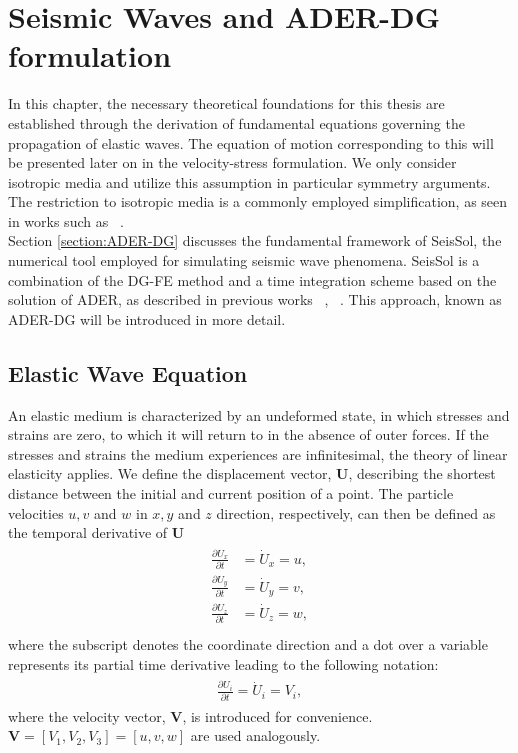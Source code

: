 
\chapter{Seismic Waves and ADER-DG formulation}\label{chapter:seismicwaves}
In this chapter, the necessary theoretical foundations for this thesis are established through the derivation of fundamental equations governing the propagation of elastic waves.
The equation of motion corresponding to this will be presented later on in the velocity-stress formulation.
We only consider isotropic media and utilize this assumption in particular symmetry arguments. The restriction to isotropic media is a commonly employed simplification, as seen in works such as ~\parencite{dumbser1}. \\

Section \ref{section:ADER-DG} discusses the fundamental framework of SeisSol, the numerical tool employed for simulating seismic wave phenomena. SeisSol is a combination
of the \ac{DG-FE} method and a time integration scheme based on the solution of \ac{ADER}, as described in previous works ~\parencite{dumbser1}, ~\parencite{seissol}. This approach, known as 
\ac{ADER}-\ac{DG} will be introduced in more detail.

\section{Elastic Wave Equation}\label{section:elasticwaveequation}
An elastic medium is characterized by an undeformed state, in which stresses and strains are zero, to which it will return to in the absence
of outer forces. If the stresses and strains the medium experiences are infinitesimal, the theory of linear elasticity applies. We define
the displacement vector, $\mathbf{U}$, describing the shortest distance between the initial and current position of a point. The particle
velocities $u,v$ and $w$ in $x, y$ and $z$ direction, respectively, can then be defined as the temporal derivative of $\mathbf{U}$
\begin{align}
    \begin{split}
    \frac{\partial U_x}{\partial t} &= \dot{U}_x = u, \\
    \frac{\partial U_y}{\partial t} &= \dot{U}_y = v, \\
    \frac{\partial U_z}{\partial t} &= \dot{U}_z = w, \\
    \end{split}
 \end{align}
where the subscript denotes the coordinate direction and a dot over a variable represents its partial time derivative leading to the following notation:
\begin{align}
    \begin{split}
        \frac{\partial U_i}{\partial t} = \dot{U}_i = V_i,
    \end{split}
    \label{equation1}
\end{align}
where the velocity vector, $\mathbf{V}$, is introduced for convenience. $\mathbf{V} = [V_1, V_2, V_3] = [u, v ,w]$ are used analogously.\\

